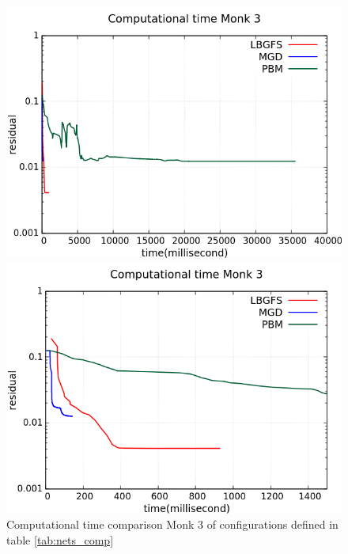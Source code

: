 \begin{figure}[H]
	\centering
	\begin{minipage}[t]{0.5\linewidth}
		\includegraphics[width=\linewidth]{data/Comparison/Monk3/Monk3_CT_Comparison_log_standard.png}
	\end{minipage}%
	\begin{minipage}[t]{0.5\linewidth}
		\includegraphics[width=\linewidth]{data/Comparison/Monk3/Monk3_CT_Comparison_log_zoom.png}
	\end{minipage}
	\caption{Computational time comparison Monk 3 of configurations defined in table \ref{tab:nets_comp}}
	\label{CT-Monk3}
\end{figure}



